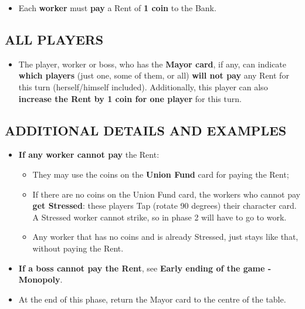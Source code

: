         \begin{itemize}
            \item Each \textbf{worker} must \textbf{pay} a Rent of \textbf{1 coin} to the Bank.
        \end{itemize}
    
    \subsection{ALL PLAYERS}

        \begin{itemize}
            \item The player, worker or boss, who has the \textbf{Mayor card}, if any, can indicate
            \textbf{which players} (just one, some of them, or all) \textbf{will not pay} any Rent for this
            turn (herself/himself included). Additionally, this player can also \textbf{increase the
            Rent by 1 coin for one player} for this turn.
        \end{itemize}
    
    \subsection{ADDITIONAL DETAILS AND EXAMPLES}

        \begin{itemize}
            \item \textbf{If any worker cannot pay} the Rent:
            \begin{itemize}
                \item They may use the coins on the \textbf{Union Fund} card for paying the
                Rent;
                \item If there are no coins on the Union Fund card, the workers who cannot
                pay \textbf{get Stressed}: these players Tap (rotate 90 degrees) their character
                card. A Stressed worker cannot strike, so in phase 2 will have to go to
                work.
                \item Any worker that has no coins and is already Stressed, just stays like
                that, without paying the Rent.
            \end{itemize}
            \item \textbf{If a boss cannot pay the Rent}, see \textbf{Early ending of the game - Monopoly}.
            \item At the end of this phase, return the Mayor card to the centre of the table.
        \end{itemize}
    

